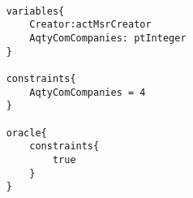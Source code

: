 	\scriptsize
	\vspace{0.5cm}
	\begin{lstlisting}[style=MessirStyle,firstnumber=auto,captionpos=b,caption={\msrmessir (MCL-oriented) specification of the test step \emph{testcase01-ts01oeCreateSystemAndEnvironment}.},label=TM-testcase01-ts01oeCreateSystemAndEnvironment-MCL-LST]

	variables{
		Creator:actMsrCreator
		AqtyComCompanies: ptInteger
	}
	
	constraints{
		AqtyComCompanies = 4
	}
	
	oracle{
		constraints{
			true
		}
	}
	
	\end{lstlisting}
	\normalsize 
	
	
